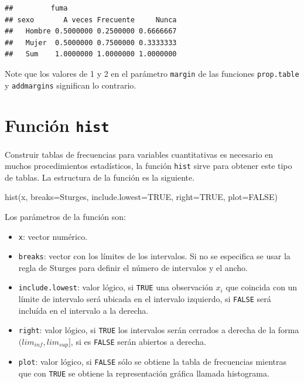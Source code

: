 \documentclass[
]{book}
\makeatletter
\newenvironment{Shaded}{\begin{snugshade}}{\end{snugshade}}
\newcommand{\AttributeTok}[1]{\textcolor[rgb]{0.77,0.63,0.00}{#1}}
\newcommand{\ConstantTok}[1]{\textcolor[rgb]{0.00,0.00,0.00}{#1}}
\newcommand{\FunctionTok}[1]{\textcolor[rgb]{0.00,0.00,0.00}{#1}}
\newcommand{\NormalTok}[1]{#1}
\newcommand{\StringTok}[1]{\textcolor[rgb]{0.31,0.60,0.02}{#1}}
\providecommand{\tightlist}{%
  \setlength{\itemsep}{0pt}\setlength{\parskip}{0pt}}
\newenvironment{kframe}{%
\medskip{}
\setlength{\fboxsep}{.8em}
 \def\at@end@of@kframe{}%
 \ifinner\ifhmode%
  \def\at@end@of@kframe{\end{minipage}}%
  \begin{minipage}{\columnwidth}%
 \fi\fi%
 \def\FrameCommand##1{\hskip\@totalleftmargin \hskip-\fboxsep
 \colorbox{shadecolor}{##1}\hskip-\fboxsep
     \hskip-\linewidth \hskip-\@totalleftmargin \hskip\columnwidth}%
 \MakeFramed {\advance\hsize-\width
   \@totalleftmargin\z@ \linewidth\hsize
   \@setminipage}}%
 {\par\unskip\endMakeFramed%
 \at@end@of@kframe}
\renewenvironment{Shaded}{\begin{kframe}}{\end{kframe}}
\newenvironment{rmdblock}[1]
  {
  \begin{itemize}
  \renewcommand{\labelitemi}{
    \raisebox{-.7\height}[0pt][0pt]{
      {\setkeys{Gin}{width=3em,keepaspectratio}\texttt{[image: images/\#1]}}
    }
  }
  \setlength{\fboxsep}{1em}
  \begin{kframe}
  \item
  }
  {
  \end{kframe}
  \end{itemize}
  }
\newenvironment{rmdwarning}
  {\begin{rmdblock}{warning}}
  {\end{rmdblock}}
\makeatother
\begin{document}
\begin{verbatim}
##         fuma
## sexo       A veces Frecuente     Nunca
##   Hombre 0.5000000 0.2500000 0.6666667
##   Mujer  0.5000000 0.7500000 0.3333333
##   Sum    1.0000000 1.0000000 1.0000000
\end{verbatim}

\begin{rmdwarning}
Note que los valores de 1 y 2 en el parámetro \texttt{margin} de las funciones \texttt{prop.table} y \texttt{addmargins} significan lo contrario.
\end{rmdwarning}

\hypertarget{funciuxf3n-hist}{%
\section{\texorpdfstring{Función \texttt{hist} }{Función hist }}\label{funciuxf3n-hist}}

Construir tablas de frecuencias para variables cuantitativas es necesario en muchos procedimientos estadísticos, la función \texttt{hist} sirve para obtener este tipo de tablas. La estructura de la función es la siguiente.

\begin{Shaded}
\begin{Highlighting}[]
\FunctionTok{hist}\NormalTok{(x, }\AttributeTok{breaks=}\StringTok{\textquotesingle{}Sturges\textquotesingle{}}\NormalTok{, }\AttributeTok{include.lowest=}\ConstantTok{TRUE}\NormalTok{, }\AttributeTok{right=}\ConstantTok{TRUE}\NormalTok{, }
     \AttributeTok{plot=}\ConstantTok{FALSE}\NormalTok{)}
\end{Highlighting}
\end{Shaded}

Los parámetros de la función son:

\begin{itemize}
\tightlist
\item
  \texttt{x}: vector numérico.
\item
  \texttt{breaks}: vector con los límites de los intervalos. Si no se especifica se usar la regla de Sturges para definir el número de intervalos y el ancho.
\item
  \texttt{include.lowest}: valor lógico, si \texttt{TRUE} una observación \(x_i\) que coincida con un límite de intervalo será ubicada en el intervalo izquierdo, si \texttt{FALSE} será incluída en el intervalo a la derecha.
\item
  \texttt{right}: valor lógico, si \texttt{TRUE} los intervalos serán cerrados a derecha de la forma \((lim_{inf}, lim_{sup}]\), si es \texttt{FALSE} serán abiertos a derecha.
\item
  \texttt{plot}: valor lógico, si \texttt{FALSE} sólo se obtiene la tabla de frecuencias mientras que con \texttt{TRUE} se obtiene la representación gráfica llamada histograma.
\end{itemize}
\end{document}
